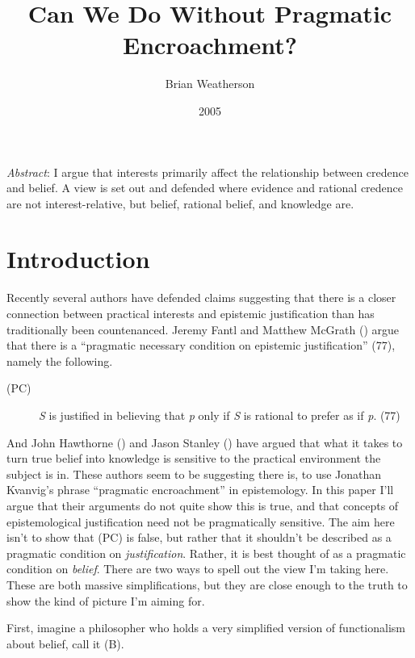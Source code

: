 \documentclass[
  11pt,
  letterpaper,
  DIV=11,
  numbers=noendperiod,
  twoside]{scrartcl}
\title{Can We Do Without Pragmatic Encroachment?}
\author{Brian Weatherson}
\date{2005}
\renewenvironment{abstract}
 {\vspace{-1.25cm}
 \quotation\small\noindent\emph{Abstract}:}
 {\endquotation}
\renewenvironment{abstract}
 {\quotation\small\noindent\emph{Abstract}:}
 {\endquotation\vspace{-0.02cm}}
\begin{document}
\maketitle
\begin{abstract}
I argue that interests primarily affect the relationship between
credence and belief. A view is set out and defended where evidence and
rational credence are not interest-relative, but belief, rational
belief, and knowledge are.
\end{abstract}


\section{Introduction}\label{introduction}

Recently several authors have defended claims suggesting that there is a
closer connection between practical interests and epistemic
justification than has traditionally been countenanced. Jeremy Fantl and
Matthew McGrath () argue that there is a
``pragmatic necessary condition on epistemic justification'' (77),
namely the following.

\begin{description}
\item[(PC)]
\emph{S} is justified in believing that \emph{p} only if \emph{S} is
rational to prefer as if \emph{p}. (77)
\end{description}

And John Hawthorne () and Jason
Stanley () have argued that what
it takes to turn true belief into knowledge is sensitive to the
practical environment the subject is in. These authors seem to be
suggesting there is, to use Jonathan Kvanvig's phrase ``pragmatic
encroachment'' in epistemology. In this paper I'll argue that their
arguments do not quite show this is true, and that concepts of
epistemological justification need not be pragmatically sensitive. The
aim here isn't to show that (PC) is false, but rather that it shouldn't
be described as a pragmatic condition on \emph{justification}. Rather,
it is best thought of as a pragmatic condition on \emph{belief}. There
are two ways to spell out the view I'm taking here. These are both
massive simplifications, but they are close enough to the truth to show
the kind of picture I'm aiming for.

First, imagine a philosopher who holds a very simplified version of
functionalism about belief, call it (B).
\end{document}

